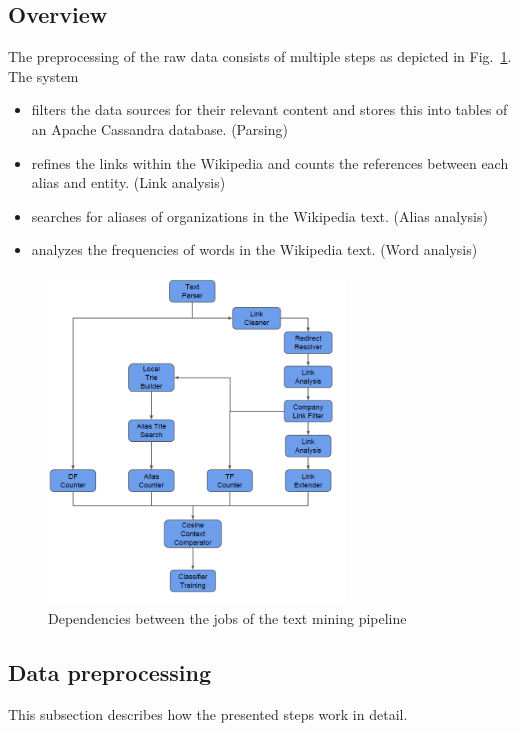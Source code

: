 \subsection{Overview}
The preprocessing of the raw data consists of multiple steps as depicted in Fig.~\ref{fig:job_dependencies}. The system
\begin{itemize}
\item filters the data sources for their relevant content and stores this into tables of an Apache Cassandra database. (Parsing)
\item refines the links within the Wikipedia and counts the references between each alias and entity. (Link analysis)
\item searches for aliases of organizations in the Wikipedia text. (Alias analysis) 
\item analyzes the frequencies of words in the Wikipedia text. (Word analysis)
\end{itemize}

\begin{figure}[ht]
	\centering
  \includegraphics[width=0.7\textwidth]{Graphics/job_dependencies.png}
	\caption{Dependencies between the jobs of the text mining pipeline}
	\label{fig:job_dependencies}
\end{figure}


\subsection{Data preprocessing}
This subsection describes how the presented steps work in detail.

